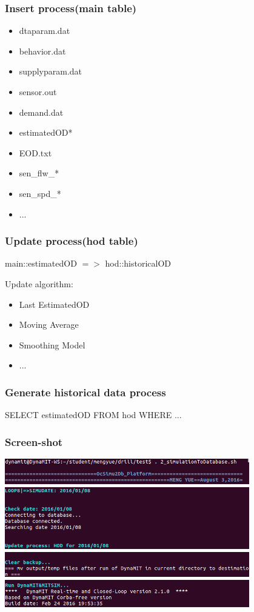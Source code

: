\documentclass[12pt]{beamer}
\begin{document}
\begin{frame}
\frametitle{Insert process(main table)}
\begin{itemize}
\item dtaparam.dat
\item behavior.dat
\item supplyparam.dat
\item sensor.out
\item demand.dat
\item estimatedOD*
\item EOD.txt
\item sen\_flw\_*
\item sen\_spd\_*
\item ...
\end{itemize}
\end{frame}

\begin{frame}
\frametitle{Update process(hod table)}
main::estimatedOD $=>$ hod::historicalOD
\vspace{0.3in}

Update algorithm:
\begin{itemize}
\item Last EstimatedOD
\item Moving Average
\item Smoothing Model
\item ...
\end{itemize}
\end{frame}

\begin{frame}
\frametitle{Generate historical data process}
SELECT estimatedOD FROM hod WHERE ...  
\end{frame}

\begin{frame}
\frametitle{Screen-shot}
\includegraphics[width = 0.8\textwidth]{scst_1.png}
\vspace{0.1in}
\includegraphics[width = 0.8\textwidth]{scst_2.png}
\vspace{0.1in}
\includegraphics[width = 0.8\textwidth]{scst_3.png}
\vspace{0.1in}
\includegraphics[width = 0.8\textwidth]{scst_4.png}
\end{frame}
\end{document}
